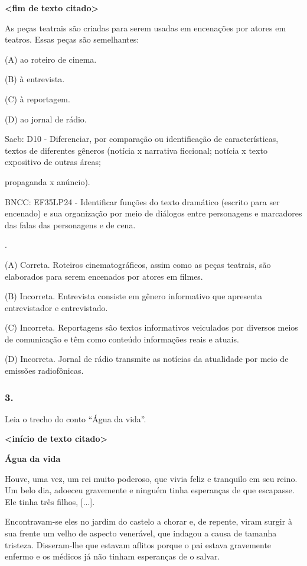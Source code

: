 \textbf{\textless{}fim de texto citado\textgreater{}}

As peças teatrais são criadas para serem usadas em encenações por atores
em teatros. Essas peças são semelhantes:

(A) ao roteiro de cinema.

(B) à entrevista.

(C) à reportagem.

(D) ao jornal de rádio.

Saeb: D10 - Diferenciar, por comparação ou identificação de
características, textos de diferentes gêneros (notícia x narrativa
ficcional; notícia x texto expositivo de outras áreas;

propaganda x anúncio).

BNCC: EF35LP24 - Identificar funções do texto dramático (escrito para
ser encenado) e sua organização por meio de diálogos entre personagens e
marcadores das falas das personagens e de cena.

.

(A) Correta. Roteiros cinematográficos, assim como as peças teatrais,
são elaborados para serem encenados por atores em filmes.

(B) Incorreta. Entrevista consiste em gênero informativo que apresenta
entrevistador e entrevistado.

(C) Incorreta. Reportagens são textos informativos veiculados por
diversos meios de comunicação e têm como conteúdo informações reais e
atuais.

(D) Incorreta. Jornal de rádio transmite as notícias da atualidade por
meio de emissões radiofônicas.

\subsubsection{3. }\label{section-31}

Leia o trecho do conto ``Água da vida''.

\textbf{\textless{}início de texto citado\textgreater{}}

\textbf{Água da vida}

Houve, uma vez, um rei muito poderoso, que vivia feliz e tranquilo em
seu reino. Um belo dia, adoeceu gravemente e ninguém tinha esperanças de
que escapasse. Ele tinha três filhos, {[}...{]}.

Encontravam-se eles no jardim do castelo a chorar e, de repente, viram
surgir à sua frente um velho de aspecto venerável, que indagou a causa
de tamanha tristeza. Disseram-lhe que estavam aflitos porque o pai
estava gravemente enfermo e os médicos já não tinham esperanças de o
salvar.

